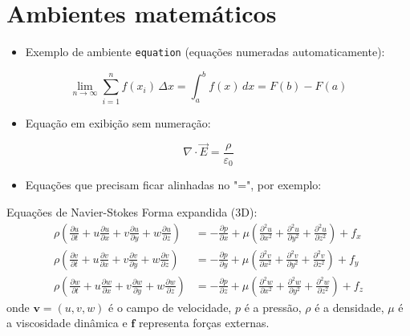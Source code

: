

\section{Ambientes matemáticos}

\begin{itemize}
    \item Exemplo de ambiente \texttt{equation} (equações numeradas automaticamente):
\end{itemize}
\begin{equation}
    \lim_{n\to \infty} \sum_{i=1}^{n} f(x_i)\,\Delta x 
    = \int_{a}^{b} f(x)\,dx = F(b) - F(a)
\end{equation}


\begin{itemize}
    \item Equação em exibição sem numeração:
\end{itemize}
\[
\nabla \cdot \vec{E} = \frac{\rho}{\varepsilon_0}
\]

\begin{itemize}
    \item Equações que precisam ficar alinhadas no "=", por exemplo:
\end{itemize}

Equações de Navier-Stokes Forma expandida (3D):
\begin{align*}
    \rho\left(\frac{\partial u}{\partial t} + u\frac{\partial u}{\partial x} + v\frac{\partial u}{\partial y} + w\frac{\partial u}{\partial z}\right) &= -\frac{\partial p}{\partial x} + \mu\left(\frac{\partial^2 u}{\partial x^2} + \frac{\partial^2 u}{\partial y^2} + \frac{\partial^2 u}{\partial z^2}\right) + f_x \\[0.3cm]
    \rho\left(\frac{\partial v}{\partial t} + u\frac{\partial v}{\partial x} + v\frac{\partial v}{\partial y} + w\frac{\partial v}{\partial z}\right) &= -\frac{\partial p}{\partial y} + \mu\left(\frac{\partial^2 v}{\partial x^2} + \frac{\partial^2 v}{\partial y^2} + \frac{\partial^2 v}{\partial z^2}\right) + f_y \\[0.3cm]
    \rho\left(\frac{\partial w}{\partial t} + u\frac{\partial w}{\partial x} + v\frac{\partial w}{\partial y} + w\frac{\partial w}{\partial z}\right) &= -\frac{\partial p}{\partial z} + \mu\left(\frac{\partial^2 w}{\partial x^2} + \frac{\partial^2 w}{\partial y^2} + \frac{\partial^2 w}{\partial z^2}\right) + f_z
\end{align*}
onde $\mathbf{v} = (u,v,w)$ é o campo de velocidade, $p$ é a pressão, $\rho$ é a densidade, $\mu$ é a viscosidade dinâmica e $\mathbf{f}$ representa forças externas.

